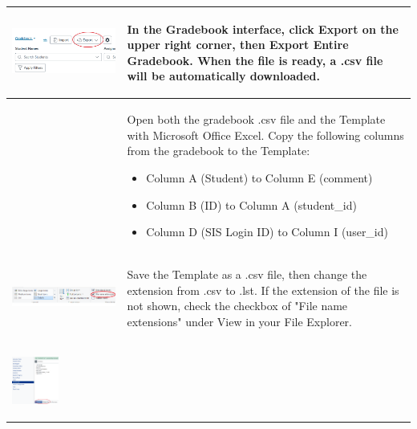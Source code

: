 \documentclass{article}
\begin{document}
{\begin{longtable}{|l|l|}
\begin{parbox}{0.45\textwidth}{\centering
\includegraphics[width=.30\textwidth]{gradebookExport.png}}
\end{parbox}&\begin{parbox}{0.45\textwidth}{
In the Gradebook interface, click Export on the upper right corner, then Export Entire Gradebook. When the file is ready, a .csv file will be automatically downloaded.}
\end{parbox}\\
\hline
\begin{parbox}{0.45\textwidth}{}
\end{parbox}&\begin{parbox}{0.45\textwidth}{Open both the gradebook .csv file and the Template with Microsoft Office Excel. Copy the following columns from the gradebook to the Template:
\begin{itemize}
\item Column A (Student) to Column E (comment)
\item Column B (ID) to Column A (student\_id)
\item Column D (SIS Login ID) to Column I (user\_id)
\end{itemize}}
\end{parbox}\\
\hline
\begin{parbox}{0.45\textwidth}{\includegraphics[width=.45\textwidth]{windowsView.png}}
\end{parbox}&\begin{parbox}{0.45\textwidth}{Save the Template as a .csv file, then change the extension from .csv to .lst. If the extension of the file is not shown, check the checkbox of "File name extensions" under View in your File Explorer.}
\end{parbox}\\
\hline
\begin{parbox}{0.45\textwidth}{\includegraphics[width=0.45\textwidth]{fileManager.png}}

\end{parbox}
\end{longtable}}
\end{document}
